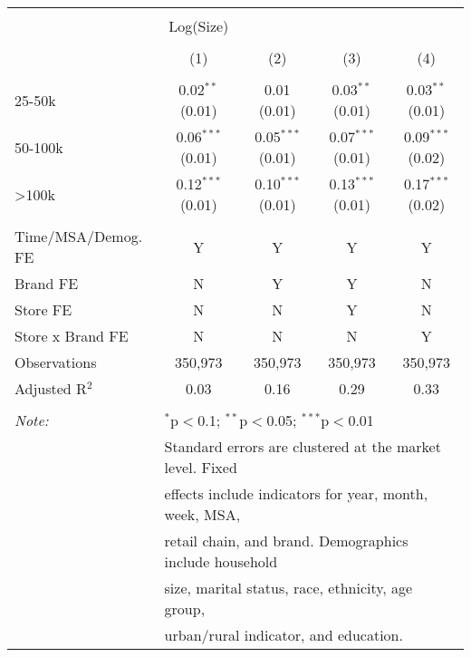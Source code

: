 
\begin{table}[!htbp] \centering 
  \caption{} 
  \label{tab:packageSizeFull7270} 
\begin{tabular}{@{\extracolsep{5pt}}lcccc} 
\\[-1.8ex]\hline 
\hline \\[-1.8ex] 
 & Log(Size) &  &  &  \\ 
\\[-1.8ex] & (1) & (2) & (3) & (4)\\ 
\hline \\[-1.8ex] 
 25-50k & 0.02$^{**}$ (0.01) & 0.01 (0.01) & 0.03$^{**}$ (0.01) & 0.03$^{**}$ (0.01) \\ 
  50-100k & 0.06$^{***}$ (0.01) & 0.05$^{***}$ (0.01) & 0.07$^{***}$ (0.01) & 0.09$^{***}$ (0.02) \\ 
  >100k & 0.12$^{***}$ (0.01) & 0.10$^{***}$ (0.01) & 0.13$^{***}$ (0.01) & 0.17$^{***}$ (0.02) \\ 
 \hline \\[-1.8ex] 
Time/MSA/Demog. FE & Y & Y & Y & Y \\ 
Brand FE & N & Y & Y & N \\ 
Store FE & N & N & Y & N \\ 
Store x Brand FE & N & N & N & Y \\ 
Observations & 350,973 & 350,973 & 350,973 & 350,973 \\ 
Adjusted R$^{2}$ & 0.03 & 0.16 & 0.29 & 0.33 \\ 
\hline 
\hline \\[-1.8ex] 
\textit{Note:}  & \multicolumn{4}{l}{$^{*}$p$<$0.1; $^{**}$p$<$0.05; $^{***}$p$<$0.01} \\ 
 & \multicolumn{4}{l}{Standard errors are clustered at the market level. Fixed } \\ 
 & \multicolumn{4}{l}{effects include indicators for year, month, week, MSA, } \\ 
 & \multicolumn{4}{l}{retail chain, and brand. Demographics include household } \\ 
 & \multicolumn{4}{l}{size, marital status, race, ethnicity, age group, } \\ 
 & \multicolumn{4}{l}{urban/rural indicator, and education.} \\ 
\end{tabular} 
\end{table} 
